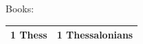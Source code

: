 \documentclass[10pt]{article}
\begin{document}
\begin{center}
\vspace{1em}
Books: \begin{tabular}{|l|l|} \hline
1 Thess & 1 Thessalonians 
\\
  \hline
\end{tabular}
\end{center}
\end{document}
